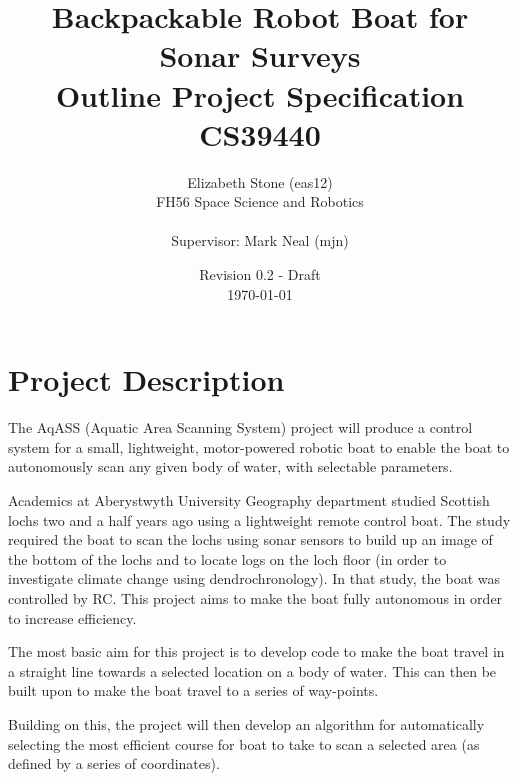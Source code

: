 \documentclass[titlepage 12pt]{article}
\title{Backpackable Robot Boat for Sonar Surveys\\ Outline Project Specification\\ CS39440}
\author{ Elizabeth Stone (eas12)\\FH56 Space Science and Robotics\\ \\Supervisor: Mark Neal (mjn) }
\date{Revision 0.2 - Draft\\ \today\vspace{-3em} }
\begin{document}
{
\selectfont


\begin{titlepage}
	\clearpage\maketitle
\thispagestyle{empty}
	 \vspace{250pt}

	
\end{titlepage}





\section{Project Description}

The AqASS (Aquatic Area Scanning System) project will produce a control system for a small, lightweight, motor-powered robotic boat to enable the boat to autonomously scan any given body of water, with selectable parameters. 

Academics at Aberystwyth University Geography department studied Scottish lochs two and a half years ago using a  lightweight remote control boat. The study required the boat to scan the lochs using sonar sensors to build up an image of the bottom of the lochs and to locate logs on the loch floor (in order to investigate climate change using dendrochronology)\cite{rbates14}. In that study, the boat was controlled by RC. This project aims to make the boat fully autonomous in order to increase efficiency.

The most basic aim for this project is to develop code to make the boat travel in a straight line towards a selected location on a body of water. This can then be built upon to make the boat travel to a series of way-points.

Building on this, the project will then develop an algorithm for automatically selecting the most efficient course for boat to take to scan a selected area (as defined by a series of coordinates). 

}
\end{document}
